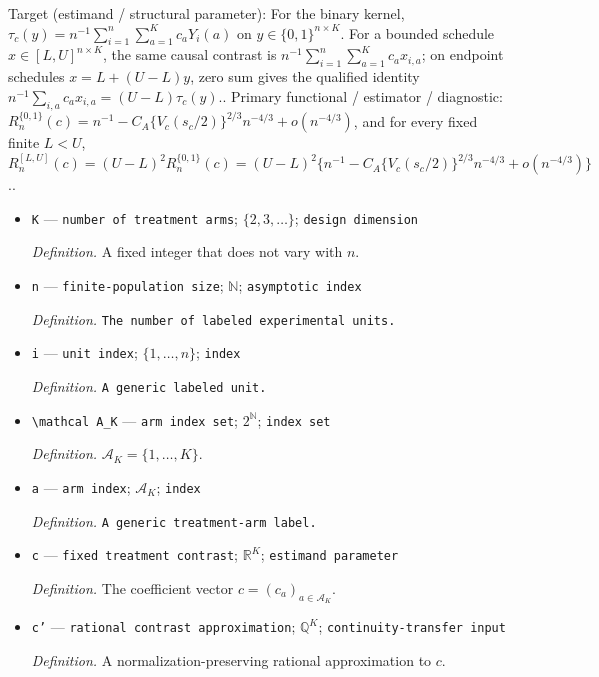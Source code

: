 \documentclass{article}
\begin{document}
Target (estimand / structural parameter): For the binary kernel, \(\tau_c(y)=n^{-1}\sum_{i=1}^n\sum_{a=1}^Kc_aY_i(a)\) on \(y\in\{0,1\}^{n\times K}\). For a bounded schedule \(x\in[L,U]^{n\times K}\), the same causal contrast is \(n^{-1}\sum_{i=1}^n\sum_{a=1}^Kc_ax_{i,a}\); on endpoint schedules \(x=L+(U-L)y\), zero sum gives the qualified identity \(n^{-1}\sum_{i,a}c_ax_{i,a}=(U-L)\tau_c(y)\)..
Primary functional / estimator / diagnostic: \(R_n^{\{0,1\}}(c)=n^{-1}-C_A\{V_c(s_c/2)\}^{2/3}n^{-4/3}+o(n^{-4/3})\), and for every fixed finite \(L<U\), \(R_n^{[L,U]}(c)=(U-L)^2R_n^{\{0,1\}}(c)=(U-L)^2\{n^{-1}-C_A\{V_c(s_c/2)\}^{2/3}n^{-4/3}+o(n^{-4/3})\}\)..
\begin{itemize}
  \item \texttt{K} --- \texttt{number of treatment arms}; \(\{2,3,\ldots\}\); \texttt{design dimension}
  \par\smallskip\noindent\emph{Definition.} A fixed integer that does not vary with \(n\).
  \item \texttt{n} --- \texttt{finite-\allowbreak{}population size}; \(\mathbb N\); \texttt{asymptotic index}
  \par\smallskip\noindent\emph{Definition.} \texttt{The number of labeled experimental units.}
  \item \texttt{i} --- \texttt{unit index}; \(\{1,\ldots,n\}\); \texttt{index}
  \par\smallskip\noindent\emph{Definition.} \texttt{A generic labeled unit.}
  \item \texttt{\textbackslash{}\allowbreak{}mathcal A\_\allowbreak{}K} --- \texttt{arm index set}; \(2^{\mathbb N}\); \texttt{index set}
  \par\smallskip\noindent\emph{Definition.} \(\mathcal A_K=\{1,\ldots,K\}\).
  \item \texttt{a} --- \texttt{arm index}; \(\mathcal A_K\); \texttt{index}
  \par\smallskip\noindent\emph{Definition.} \texttt{A generic treatment-\allowbreak{}arm label.}
  \item \texttt{c} --- \texttt{fixed treatment contrast}; \(\mathbb R^K\); \texttt{estimand parameter}
  \par\smallskip\noindent\emph{Definition.} The coefficient vector \(c=(c_a)_{a\in\mathcal A_K}\).
  \item \texttt{c'} --- \texttt{rational contrast approximation}; \(\mathbb Q^K\); \texttt{continuity-\allowbreak{}transfer input}
  \par\smallskip\noindent\emph{Definition.} A normalization-preserving rational approximation to \(c\).

\end{itemize}
\end{document}
